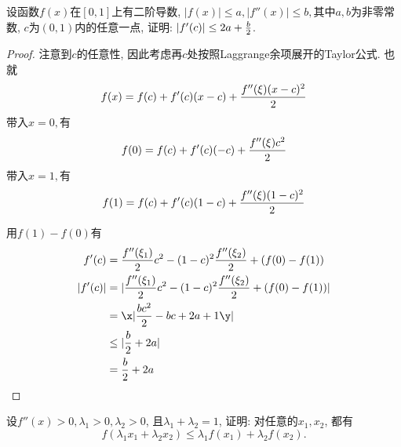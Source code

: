 \begin{prob}
    设函数$f(x)$在$[0,1]$上有二阶导数, $|f(x)|\leq a, |f''(x)|\leq b, $其中$a, b$为非零常数, $c$为$(0,1)$内的任意一点, 证明: $|f'(c)|\leq 2a+{b\over 2}$.
\end{prob}

\begin{proof}
    注意到$c$的任意性, 因此考虑再$c$处按照Laggrange余项展开的Taylor公式. 也就
    $$
    f(x)=f(c)+f'(c)(x-c)+{f''(\xi)(x-c)^2 \over 2}
    $$
    带入$x=0,$有
    $$
    f(0)=f(c)+f'(c)(-c)+{f''(\xi)c^2 \over 2} 
    $$
    带入$x=1,$有
    $$
    f(1)=f(c)+f'(c)(1-c)+{f''(\xi)(1-c)^2 \over 2} 
    $$

    用$f(1)-f(0)$有
    \begin{align*}
        f'(c) &= {f''(\xi_1)\over 2}c^2-(1-c)^2{f''(\xi_2) \over 2}+(f(0)-f(1))\\
        |f'(c)| &= |{f''(\xi_1)\over 2}c^2-(1-c)^2{f''(\xi_2) \over 2}+(f(0)-f(1))|\\
        &=\x|{bc^2\over 2} -bc+2a+1\y|\\
        &\leq |{b\over 2}+2a| \\&= {b\over 2}+2a
    \end{align*}
    
\end{proof}



\begin{prob}
    设$f''(x)>0, \lambda_1>0, \lambda_2>0$, 且$\lambda_1+\lambda_2=1$, 证明: 对任意的$x_1, x_2$, 都有
    $$
    f(\lambda_1x_1+\lambda_2x_2)\leq \lambda_1f(x_1)+\lambda_2f(x_2).
    $$
\end{prob}

